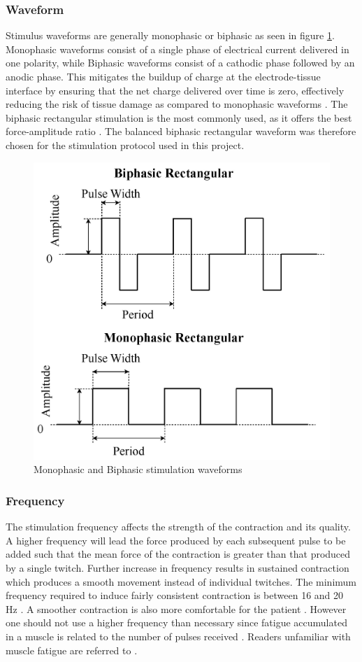 \subsubsection{Waveform}
Stimulus waveforms are generally monophasic or biphasic as seen in figure \ref{fig:twowave}. Monophasic waveforms consist of a single phase of electrical current delivered in one polarity, while Biphasic waveforms consist of a cathodic phase followed by an anodic phase. This mitigates the buildup of charge at the electrode-tissue interface by ensuring that the net charge delivered over time is zero, effectively reducing the risk of tissue damage as compared to monophasic waveforms \cite{peckham_functional_2005}. The biphasic rectangular stimulation is the most commonly used, as it offers the best force-amplitude ratio \cite{lynch_functional_2008}. The balanced biphasic rectangular waveform was therefore chosen for the stimulation protocol used in this project.
 \begin{figure} [H]
     \centering
     \includegraphics[width=0.6\linewidth]{images/twowaveform.jpg}
     \caption{Monophasic and Biphasic stimulation waveforms}
     \label{fig:twowave}
 \end{figure}

 \subsubsection{Frequency}
 The stimulation frequency affects the strength of the contraction and its quality. A higher frequency will lead the force produced by each subsequent pulse to be added such that the mean force of the contraction is greater than that produced by a single twitch. Further increase in frequency results in sustained contraction which produces a smooth movement instead of individual twitches. The minimum frequency required to induce fairly consistent contraction is between 16 and 20 Hz \cite{marquez-chin_functional_2020}. A smoother contraction is also more comfortable for the patient \cite{wood_chapter_2020}. However one should not use a higher frequency than necessary since fatigue accumulated in a muscle is related to the number of pulses received \cite{bigland-ritchie_muscle_2000}. Readers unfamiliar with muscle fatigue are referred to \cite{thrasher_reducing_2005}.

